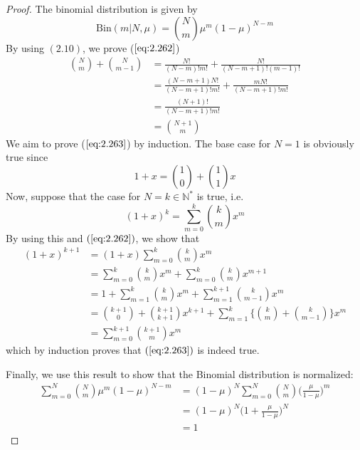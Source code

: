 \begin{proof}
    The binomial distribution is given by
    \begin{equation*}
        \text{Bin}(m | N, \mu) = \binom{N}{m} \mu^m (1-\mu)^{N - m}
        \tag{2.9}\label{eq:2.9}
    \end{equation*}
    By using $(2.10)$, we prove ($\ref{eq:2.262}$)
    \begin{align*}
        \binom{N}{m} + \binom{N}{m - 1} 
        &= \frac{N!}{(N - m)!m!} + \frac{N!}{(N - m + 1)!(m - 1)!} \\
        &= \frac{(N - m + 1)N!}{(N - m + 1)!m!} + \frac{mN!}{(N - m + 1)!m!} \\
        &= \frac{(N + 1)!}{(N - m + 1)!m!} \\
        &= \binom{N + 1}{m} \tag{2.262}
    \end{align*}
    We aim to prove ($\ref{eq:2.263}$) by induction. The base 
    case for $N=1$ is obviously true since $$1+x = \binom{1}{0} + \binom{1}{1}x$$
    Now, suppose that the case for $N=k \in \mathbb{N}^*$ is true, i.e.
    \[
        (1 + x)^k = \sum_{m=0}^{k} \binom{k}{m} x^m 
    \] 
    By using this and $(\ref{eq:2.262})$, we show that 
    \begin{align*}
        (1 + x)^{k + 1} 
        &= (1 + x) \sum_{m=0}^{k} \binom{k}{m} x^m \\
        &= \sum_{m=0}^{k} \binom{k}{m} x^m + \sum_{m=0}^{k} \binom{k}{m} x^{m+1} \\
        &= 1 + \sum_{m=1}^{k} \binom{k}{m} x^m + \sum_{m=1}^{k + 1} \binom{k}{m - 1} x^m \\
        &= \binom{k+1}{0} + \binom{k+1}{k+1}x^{k + 1} + \sum_{m=1}^{k} \bigg\{\binom{k}{m} + \binom{k}{m-1}\bigg\}x^m \\
        &= \sum_{m=0}^{k+1} \binom{k+1}{m} x^m 
    \end{align*}
    which by induction proves that $(\ref{eq:2.263})$ is indeed true. 

    Finally, we use this result to show that the Binomial distribution is normalized:
    \begin{align*}
        \sum_{m=0}^{N} \binom{N}{m} \mu^m(1 - \mu)^{N - m}
        &= (1 - \mu)^N \sum_{m=0}^{N} \binom{N}{m} \bigg(\frac{\mu}{1 - \mu}\bigg)^m \\
        &= (1 - \mu)^N \bigg(1 + \frac{\mu}{1 - \mu}\bigg)^N \\
        &= 1 \tag{2.264}
    \end{align*}
\end{proof}

